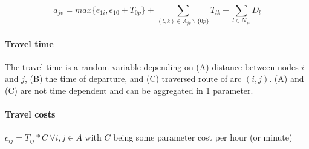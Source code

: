 \documentclass[a4paper,10pt,twoside]{report}
\begin{document}
\begin{equation} \label{eq:arrivalTimeWithTW}
a_{jv} = max\{e_{1i}, e_{10}+T_{0p}\} + \displaystyle\sum_{(l,k) \in A_{jv}\backslash\{0p\}} T_{lk} + \displaystyle\sum_{l \in N_{jv}} D_l
\end{equation}

\paragraph{Travel time}
The travel time is a random variable depending on (A) distance between nodes $i$ and $j$, (B) the time of departure, and (C) traversed route of arc $(i,j)$. (A) and (C) are not time dependent and can be aggregated in 1 parameter. 

\paragraph{Travel costs}
$c_{ij} = T_{ij}*C\ \forall i,j \in A$
with $C$ being some parameter cost per hour (or minute)
\end{document}
